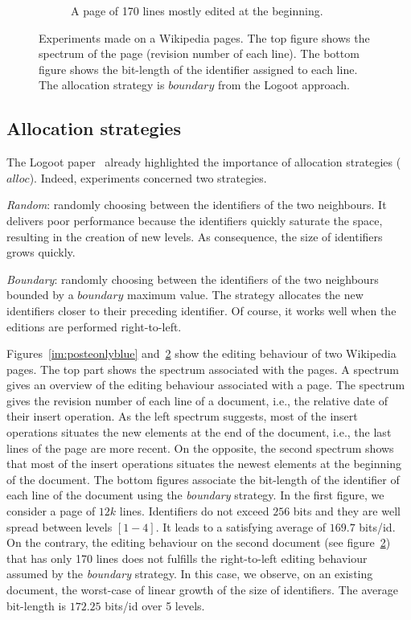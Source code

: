 \begin{figure}
\begin{subfigure}[t]{0.47\textwidth}
\caption{A page of 170 lines mostly edited at the beginning.}
\label{im:didyouknowonlyblue}
\end{subfigure}
\caption{Experiments made on a Wikipedia pages. The top figure shows the
  spectrum of the page (revision number of each line). The bottom figure shows
  the bit-length of the identifier assigned to each line. The allocation
  strategy is $boundary$ from the Logoot approach.}
\end{figure}

\subsection{Allocation strategies}
The Logoot paper~\cite{weiss2009logoot} already highlighted the importance of
allocation strategies ($alloc$). Indeed, experiments concerned two strategies.
\begin{inparaenum}[(1)]
\item \emph{Random}: randomly choosing between the identifiers of the two
  neighbours. It delivers poor performance because the identifiers quickly
  saturate the space, resulting in the creation of new levels. As consequence,
  the size of identifiers grows quickly.
\item \emph{Boundary}: randomly choosing between the identifiers of the two
  neighbours bounded by a $boundary$ maximum value. The strategy allocates the
  new identifiers closer to their preceding identifier. Of course, it works
  well when the editions are performed right-to-left.
\end{inparaenum}

Figures~\ref{im:posteonlyblue} and~\ref{im:didyouknowonlyblue} show the editing
behaviour of two Wikipedia pages. The top part shows the spectrum associated
with the pages. A spectrum gives an overview of the editing behaviour
associated with a page. The spectrum gives the revision number of each line of
a document, i.e., the relative date of their insert operation.  As the left
spectrum suggests, most of the insert operations situates the new elements at
the end of the document, i.e., the last lines of the page are more recent. On
the opposite, the second spectrum shows that most of the insert operations
situates the newest elements at the beginning of the document.  The bottom
figures associate the bit-length of the identifier of each line of the document
using the \emph{boundary} strategy. In the first figure, we consider a page of
$12k$ lines. Identifiers do not exceed $256$ bits and they are well spread
between levels $[1-4]$. It leads to a satisfying average of $169.7$ bits/id. On
the contrary, the editing behaviour on the second document (see
figure~\ref{im:didyouknowonlyblue}) that has only 170 lines does not fulfills
the right-to-left editing behaviour assumed by the \emph{boundary} strategy. In
this case, we observe, on an existing document, the worst-case of linear growth
of the size of identifiers.  The average bit-length is $172.25$ bits/id over 5
levels.

